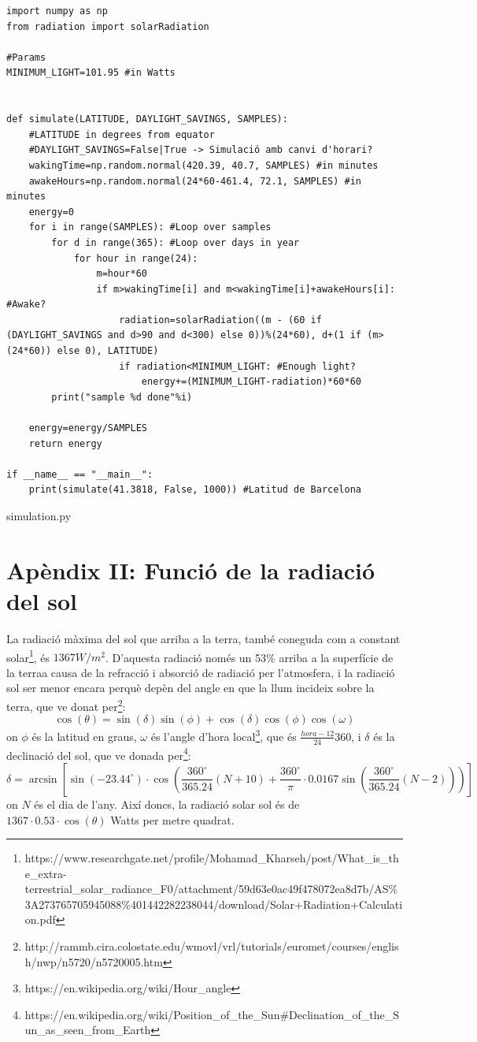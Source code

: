 \documentclass{article}
\begin{document}
\begin{lstlisting}[style=JavaStyle]
import numpy as np
from radiation import solarRadiation

#Params
MINIMUM_LIGHT=101.95 #in Watts


def simulate(LATITUDE, DAYLIGHT_SAVINGS, SAMPLES):
    #LATITUDE in degrees from equator
    #DAYLIGHT_SAVINGS=False|True -> Simulació amb canvi d'horari?
    wakingTime=np.random.normal(420.39, 40.7, SAMPLES) #in minutes
    awakeHours=np.random.normal(24*60-461.4, 72.1, SAMPLES) #in minutes
    energy=0
    for i in range(SAMPLES): #Loop over samples
        for d in range(365): #Loop over days in year
            for hour in range(24):
                m=hour*60
                if m>wakingTime[i] and m<wakingTime[i]+awakeHours[i]: #Awake?
                    radiation=solarRadiation((m - (60 if (DAYLIGHT_SAVINGS and d>90 and d<300) else 0))%(24*60), d+(1 if (m>(24*60)) else 0), LATITUDE)
                    if radiation<MINIMUM_LIGHT: #Enough light?
                        energy+=(MINIMUM_LIGHT-radiation)*60*60
        print("sample %d done"%i)

    energy=energy/SAMPLES
    return energy

if __name__ == "__main__":
    print(simulate(41.3818, False, 1000)) #Latitud de Barcelona
\end{lstlisting}
simulation.py

\section*{Apèndix II: Funció de la radiació del sol}
La radiació màxima del sol que arriba a la terra, també coneguda com a constant solar\footnote{\label{sunstuff}https://www.researchgate.net/profile/Mohamad\_Kharseh/post/What\_is\_the\_extra-terrestrial\_solar\_radiance\_F0/attachment/59d63e0ac49f478072ea8d7b/AS\%3A273765705945088\%401442282238044/download/Solar+Radiation+Calculation.pdf}, és $1367 W/m^2$. D'aquesta radiació només un 53\% arriba a la superfície de la terra\footnotemark[\ref{sunstuff}] a causa de la refracció i absorció de radiació per l'atmosfera, i la radiació sol ser menor encara perquè depèn del angle en que la llum incideix sobre la terra, que ve donat per\footnote{http://rammb.cira.colostate.edu/wmovl/vrl/tutorials/euromet/courses/english/nwp/n5720/n5720005.htm}:
$$\cos(\theta)=\sin(\delta)\sin(\phi)+\cos(\delta)\cos(\phi)\cos(\omega)$$
on $\phi$ és la latitud en graus, $\omega$ és l'angle d'hora local\footnote{https://en.wikipedia.org/wiki/Hour\_angle}, que és $\frac{hora-12}{24}360$, i $\delta$ és la declinació del sol, que ve donada per\footnote{https://en.wikipedia.org/wiki/Position\_of\_the\_Sun\#Declination\_of\_the\_Sun\_as\_seen\_from\_Earth}:
$$\delta=\arcsin \left[\sin \left(-23.44^{\circ }\right)\cdot \cos \left({\frac {360^{\circ }}{365.24}}\left(N+10\right)+{\frac {360^{\circ }}{\pi }}\cdot 0.0167\sin \left({\frac {360^{\circ }}{365.24}}\left(N-2\right)\right)\right)\right]$$
on $N$ és el dia de l'any. Així doncs, la radiació solar sol és de $1367\cdot0.53\cdot\cos(\theta)$ Watts per metre quadrat.
\end{document}
